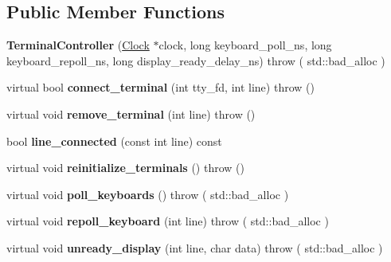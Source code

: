 \subsection*{Public Member Functions}
\begin{DoxyCompactItemize}
\item 
\hypertarget{classTerminalController_a1c0eb6e303af08fd8a3339f148947d45}{
{\bfseries TerminalController} (\hyperlink{classClock}{Clock} $\ast$clock, long keyboard\_\-poll\_\-ns, long keyboard\_\-repoll\_\-ns, long display\_\-ready\_\-delay\_\-ns)  throw ( std::bad\_\-alloc )}
\label{classTerminalController_a1c0eb6e303af08fd8a3339f148947d45}

\item 
\hypertarget{classTerminalController_acf0828324151635cac47807c736a1308}{
virtual bool {\bfseries connect\_\-terminal} (int tty\_\-fd, int line)  throw ()}
\label{classTerminalController_acf0828324151635cac47807c736a1308}

\item 
\hypertarget{classTerminalController_aea2409c72052fcd47289b447f83eb10a}{
virtual void {\bfseries remove\_\-terminal} (int line)  throw ()}
\label{classTerminalController_aea2409c72052fcd47289b447f83eb10a}

\item 
\hypertarget{classTerminalController_a157b1f7b289043c3b27470230875d9c3}{
bool {\bfseries line\_\-connected} (const int line) const }
\label{classTerminalController_a157b1f7b289043c3b27470230875d9c3}

\item 
\hypertarget{classTerminalController_a0e2d66f0e2cbe7373bf8e0ba4ac6c5b1}{
virtual void {\bfseries reinitialize\_\-terminals} ()  throw ()}
\label{classTerminalController_a0e2d66f0e2cbe7373bf8e0ba4ac6c5b1}

\item 
\hypertarget{classTerminalController_a343a40e774eeb2506b0bfbc5817d0c62}{
virtual void {\bfseries poll\_\-keyboards} ()  throw ( std::bad\_\-alloc )}
\label{classTerminalController_a343a40e774eeb2506b0bfbc5817d0c62}

\item 
\hypertarget{classTerminalController_a985b6892fc255a919238acecb947a978}{
virtual void {\bfseries repoll\_\-keyboard} (int line)  throw ( std::bad\_\-alloc )}
\label{classTerminalController_a985b6892fc255a919238acecb947a978}

\item 
\hypertarget{classTerminalController_acf0314b08dad27cfe57bf374cecbc5a3}{
virtual void {\bfseries unready\_\-display} (int line, char data)  throw ( std::bad\_\-alloc )}
\label{classTerminalController_acf0314b08dad27cfe57bf374cecbc5a3}


\end{DoxyCompactItemize}
